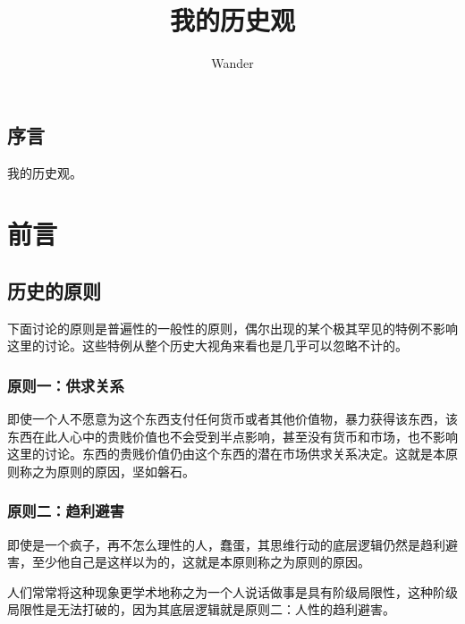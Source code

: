 \documentclass[12pt,oneside]{book}
\title{我的历史观}
\author{Wander}
\begin{document}



\frontmatter 
{}
\chapter*{序言}
我的历史观。


\setcounter{tocdepth}{2}    
\tableofcontents



\mainmatter

\part{前言}
\chapter{历史的原则}
下面讨论的原则是普遍性的一般性的原则，偶尔出现的某个极其罕见的特例不影响这里的讨论。这些特例从整个历史大视角来看也是几乎可以忽略不计的。


\section{原则一：供求关系}

即使一个人不愿意为这个东西支付任何货币或者其他价值物，暴力获得该东西，该东西在此人心中的贵贱价值也不会受到半点影响，甚至没有货币和市场，也不影响这里的讨论。东西的贵贱价值仍由这个东西的潜在市场供求关系决定。这就是本原则称之为原则的原因，坚如磐石。


\section{原则二：趋利避害}

即使是一个疯子，再不怎么理性的人，蠢蛋，其思维行动的底层逻辑仍然是趋利避害，至少他自己是这样以为的，这就是本原则称之为原则的原因。

人们常常将这种现象更学术地称之为一个人说话做事是具有阶级局限性，这种阶级局限性是无法打破的，因为其底层逻辑就是原则二：人性的趋利避害。
\end{document}

